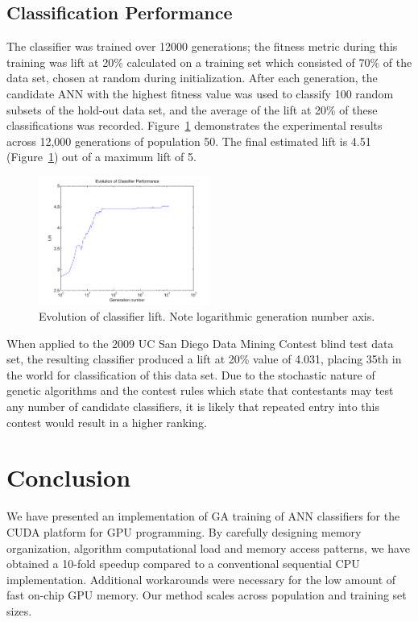 \documentclass[11pt]{article}       %
\begin{document}
\subsection{Classification Performance} \label{results}
The classifier was trained over 12000 generations; the fitness metric during this training was lift at 20\% calculated on a training set which consisted of 70\% of the data set, chosen at random during initialization.  After each generation, the candidate ANN with the highest fitness value was used to classify 100 random subsets of the hold-out data set, and the average of the lift at 20\% of these classifications was recorded.  Figure~\ref{fig:evolution-lift} demonstrates the experimental results across 12,000 generations of population 50. The final estimated lift is 4.51 (Figure~\ref{fig:evolution-lift}) out of a maximum lift of 5.

\begin{figure}[h]
	\centering
	\includegraphics[width=0.5\textwidth]{fig-evolution-lift}
	\caption{Evolution of classifier lift. Note logarithmic generation number axis.}
	\label{fig:evolution-lift}
\end{figure}

When applied to the 2009 UC San Diego Data Mining Contest blind test data set, the resulting classifier produced a lift at 20\% value of 4.031, placing 35th in the world for classification of this data set. Due to the stochastic nature of genetic algorithms and the contest rules which state that contestants may test any number of candidate classifiers, it is likely that repeated entry into this contest would result in a higher ranking.

\section{Conclusion} \label{concl}
We have presented an implementation of GA training of ANN classifiers for the CUDA platform for GPU programming. By carefully designing memory organization, algorithm computational load and memory access patterns, we have obtained a 10-fold speedup compared to a conventional sequential CPU implementation. Additional workarounds were necessary for the low amount of fast on-chip GPU memory. Our method scales across population and training set sizes.
\end{document}
